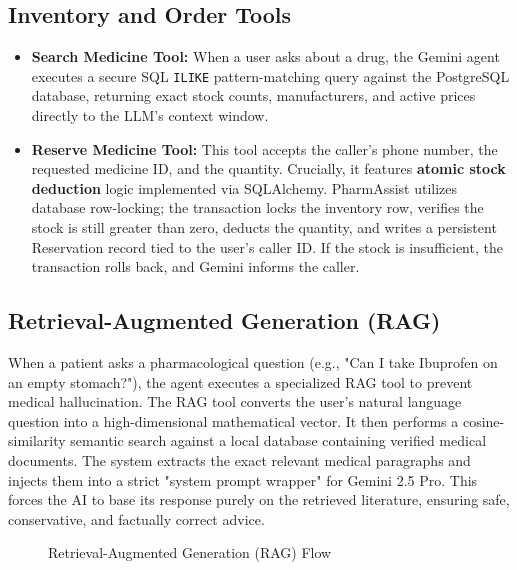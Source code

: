 \documentclass[conference]{IEEEtran}
\begin{document}
\subsection{Inventory and Order Tools}
\begin{itemize}
    \item \textbf{Search Medicine Tool:} When a user asks about a drug, the Gemini agent executes a secure SQL \texttt{ILIKE} pattern-matching query against the PostgreSQL database, returning exact stock counts, manufacturers, and active prices directly to the LLM's context window.
    \item \textbf{Reserve Medicine Tool:} This tool accepts the caller's phone number, the requested medicine ID, and the quantity. Crucially, it features \textbf{atomic stock deduction} logic implemented via SQLAlchemy. PharmAssist utilizes database row-locking; the transaction locks the inventory row, verifies the stock is still greater than zero, deducts the quantity, and writes a persistent Reservation record tied to the user's caller ID. If the stock is insufficient, the transaction rolls back, and Gemini informs the caller.
\end{itemize}

\subsection{Retrieval-Augmented Generation (RAG)}
When a patient asks a pharmacological question (e.g., "Can I take Ibuprofen on an empty stomach?"), the agent executes a specialized RAG tool to prevent medical hallucination. The RAG tool converts the user's natural language question into a high-dimensional mathematical vector. It then performs a cosine-similarity semantic search against a local database containing verified medical documents. The system extracts the exact relevant medical paragraphs and injects them into a strict "system prompt wrapper" for Gemini 2.5 Pro. This forces the AI to base its response purely on the retrieved literature, ensuring safe, conservative, and factually correct advice.

\begin{figure}[H]
\centering
{}
\caption{Retrieval-Augmented Generation (RAG) Flow}
\end{figure}
\end{document}
